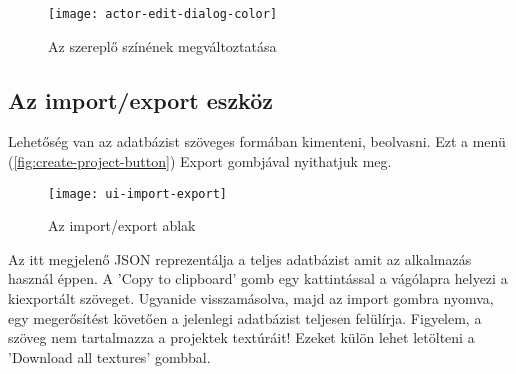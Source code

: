 \begin{figure}[h!]
	\centering
	\texttt{[image: actor-edit-dialog-color]}
	\caption{Az szereplő színének megváltoztatása}
	\label{fig:actor-edit-dialog-color}
\end{figure}


\subsection{Az import/export eszköz} \label{section:ui-import-export}

Lehetőség van az adatbázist szöveges formában kimenteni, beolvasni. Ezt a menü (\ref{fig:create-project-button}) Export gombjával nyithatjuk meg.

\begin{figure}[h!]
	\centering
	\texttt{[image: ui-import-export]}
	\caption{Az import/export ablak}
	\label{fig:ui-import-export}
\end{figure}

Az itt megjelenő JSON \cite{JSON} reprezentálja a teljes adatbázist amit az alkalmazás használ éppen. A 'Copy to clipboard' gomb egy kattintással a vágólapra helyezi a kiexportált szöveget. Ugyanide visszamásolva, majd az import gombra nyomva, egy megerősítést követően a jelenlegi adatbázist teljesen felülírja. Figyelem, a szöveg nem tartalmazza a projektek textúráit! Ezeket külön lehet letölteni a 'Download all textures' gombbal.
